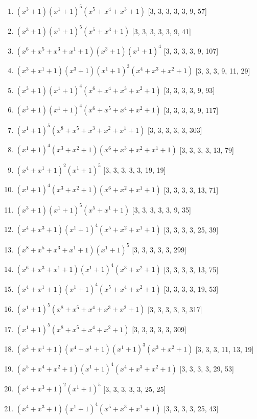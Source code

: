\documentclass[10pt,twocolumn]{article}
\begin{document}
\begin{enumerate}
\item $(x^{3} + 1)(x^{1} + 1)^{5}(x^{5} + x^{4} + x^{3} + 1)$  [3, 3, 3, 3, 3, 9, 57]
\item $(x^{3} + 1)(x^{1} + 1)^{5}(x^{5} + x^{3} + 1)$  [3, 3, 3, 3, 3, 9, 41]
\item $(x^{6} + x^{5} + x^{3} + x^{1} + 1)(x^{3} + 1)(x^{1} + 1)^{4}$  [3, 3, 3, 3, 9, 107]
\item $(x^{3} + x^{1} + 1)(x^{3} + 1)(x^{1} + 1)^{3}(x^{4} + x^{3} + x^{2} + 1)$  [3, 3, 3, 9, 11, 29]
\item $(x^{3} + 1)(x^{1} + 1)^{4}(x^{6} + x^{4} + x^{3} + x^{2} + 1)$  [3, 3, 3, 3, 9, 93]
\item $(x^{3} + 1)(x^{1} + 1)^{4}(x^{6} + x^{5} + x^{4} + x^{2} + 1)$  [3, 3, 3, 3, 9, 117]
\item $(x^{1} + 1)^{5}(x^{8} + x^{5} + x^{3} + x^{2} + x^{1} + 1)$  [3, 3, 3, 3, 3, 303]
\item $(x^{1} + 1)^{4}(x^{3} + x^{2} + 1)(x^{6} + x^{3} + x^{2} + x^{1} + 1)$  [3, 3, 3, 3, 13, 79]
\item $(x^{4} + x^{1} + 1)^{2}(x^{1} + 1)^{5}$  [3, 3, 3, 3, 3, 19, 19]
\item $(x^{1} + 1)^{4}(x^{3} + x^{2} + 1)(x^{6} + x^{2} + x^{1} + 1)$  [3, 3, 3, 3, 13, 71]
\item $(x^{3} + 1)(x^{1} + 1)^{5}(x^{5} + x^{1} + 1)$  [3, 3, 3, 3, 3, 9, 35]
\item $(x^{4} + x^{3} + 1)(x^{1} + 1)^{4}(x^{5} + x^{2} + x^{1} + 1)$  [3, 3, 3, 3, 25, 39]
\item $(x^{8} + x^{5} + x^{3} + x^{1} + 1)(x^{1} + 1)^{5}$  [3, 3, 3, 3, 3, 299]
\item $(x^{6} + x^{3} + x^{1} + 1)(x^{1} + 1)^{4}(x^{3} + x^{2} + 1)$  [3, 3, 3, 3, 13, 75]
\item $(x^{4} + x^{1} + 1)(x^{1} + 1)^{4}(x^{5} + x^{4} + x^{2} + 1)$  [3, 3, 3, 3, 19, 53]
\item $(x^{1} + 1)^{5}(x^{8} + x^{5} + x^{4} + x^{3} + x^{2} + 1)$  [3, 3, 3, 3, 3, 317]
\item $(x^{1} + 1)^{5}(x^{8} + x^{5} + x^{4} + x^{2} + 1)$  [3, 3, 3, 3, 3, 309]
\item $(x^{3} + x^{1} + 1)(x^{4} + x^{1} + 1)(x^{1} + 1)^{3}(x^{3} + x^{2} + 1)$  [3, 3, 3, 11, 13, 19]
\item $(x^{5} + x^{4} + x^{2} + 1)(x^{1} + 1)^{4}(x^{4} + x^{3} + x^{2} + 1)$  [3, 3, 3, 3, 29, 53]
\item $(x^{4} + x^{3} + 1)^{2}(x^{1} + 1)^{5}$  [3, 3, 3, 3, 3, 25, 25]
\item $(x^{4} + x^{3} + 1)(x^{1} + 1)^{4}(x^{5} + x^{3} + x^{1} + 1)$  [3, 3, 3, 3, 25, 43]

\end{enumerate}
\end{document}
